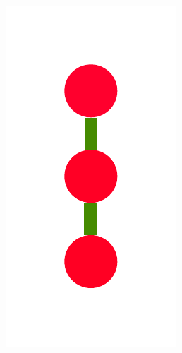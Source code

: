 \documentclass[a4paper,10pt]{article}
\begin{document}
\begin{figure}
{    \includegraphics[scale=.14]{./figures/6-3-recursion-induced-3.pdf}
}
\end{figure}
\end{document}
